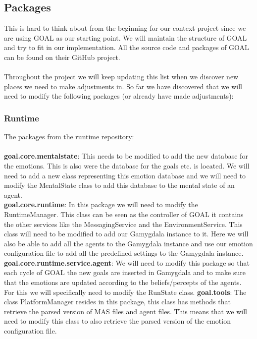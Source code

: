 \documentclass[]{article}
\begin{document}
\subsection{Packages}
This is hard to think about from the beginning for our context project since we are using GOAL as our starting point. We will maintain the structure of GOAL and try to fit in our implementation. All the source code and \gls{packages} of GOAL can be found on their GitHub project.
\\
\\
Throughout the project we will keep updating this list when we discover new places we need to make adjustments in. So far we have discovered that we will need to modify the following packages (or already have made adjustments):

\subsubsection{Runtime}
The packages from the runtime repository: \\ \\
\textbf{goal.core.mentalstate}: This needs to be modified to add the new database for the emotions. This is also were the database for the goals etc. is located. We will need to add a new class representing this emotion database and we will need to modify the MentalState class to add this database to the mental state of an agent. \\
\textbf{goal.core.runtime}: In this package we will need to modify the RuntimeManager. This class can be seen as the controller of GOAL it contains the other services like the MessagingService and the EnvironmentService. This class will need to be modified to add our Gamygdala instance to it. Here we will also be able to add all the agents to the Gamygdala instance and use our emotion configuration file to add all the predefined settings to the Gamygdala instance. \\
\textbf{goal.core.runtime.service.agent}: We will need to modify this package so that each cycle of \gls{GOAL} the new goals are inserted in Gamygdala and to make sure that the emotions are updated according to the beliefs/percepts of the agents. For this we will specifically need to modify the RunState class.
\textbf{goal.tools}: The class PlatformManager resides in this package, this class has methods that retrieve the parsed version of MAS files and agent files. This means that we will need to modify this class to also retrieve the parsed version of the emotion configuration file.
\end{document}
